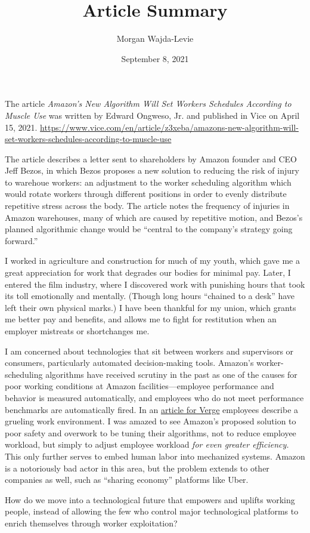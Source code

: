 \documentclass[12pt]{article}
\author{Morgan Wajda-Levie}
\date{September 8, 2021}
\title{Article Summary}
\begin{document}
\maketitle

The article \emph{Amazon's New Algorithm Will Set Workers Schedules According
to Muscle Use} was written by Edward Ongweso, Jr. and published in Vice on
April 15, 2021.
\mbox{\fontsize{7}{7}\url{https://www.vice.com/en/article/z3xeba/amazons-new-algorithm-will-set-workers-schedules-according-to-muscle-use}}

The article describes a letter sent to shareholders by Amazon founder and CEO
Jeff Bezos, in which Bezos proposes a new solution to reducing the risk of
injury to warehoue workers: an adjustment to the worker scheduling
algorithm which would rotate workers through different positions in order to
evenly distribute repetitive stress across the body. The article notes the
frequency of injuries in Amazon warehouses, many of which are caused by
repetitive motion, and Bezos's planned algorithmic change would be ``central
to the company's strategy going forward.''

I worked in agriculture and construction for much of my youth, which gave me a
great appreciation for work that degrades our bodies for minimal pay. Later, I
entered the film industry, where I discovered work with punishing hours that
took its toll emotionally and mentally. (Though long hours ``chained to a
desk'' have left their own physical marks.) I have been thankful for my union,
which grants me better pay and benefits, and allows me to fight for
restitution when an employer mistreats or shortchanges me.

I am concerned about technologies that sit between workers and supervisors or
consumers, particularly automated decision-making tools.  Amazon's
worker-scheduling algorithms have received scrutiny in the past as one of the
causes for poor working conditions at Amazon facilities---employee performance
and behavior is measured automatically, and employees who do not meet
performance benchmarks are automatically fired.  In an
\href{https://www.theverge.com/2019/4/25/18516004/amazon-warehouse-fulfillment-centers-productivity-firing-terminations}{article
for Verge} employees describe a grueling work environment. I was amazed to see
Amazon's proposed solution to poor safety and overwork to be tuning their
algorithms, not to reduce employee workload, but simply to adjust employee
workload \emph{for even greater efficiency.} This only further serves to embed
human labor into mechanized systems.  Amazon is a notoriously bad actor in
this area, but the problem extends to other companies as well, such as
``sharing economy'' platforms like Uber.

How do we move into a technological future that empowers and uplifts working
people, instead of allowing the few who control major technological platforms
to enrich themselves through worker exploitation?
\end{document}
